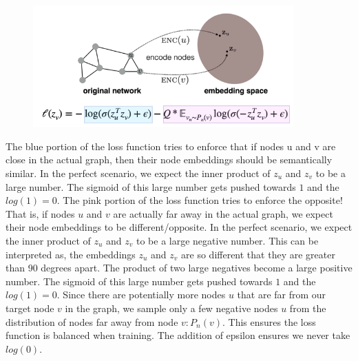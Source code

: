 \documentclass[12pt,a4paper]{article}
\begin{document}
\begin{figure}[h]
\includegraphics[width=10cm]{GraphSAGE-PIC-4}
\centering
\end{figure}
The blue portion of the loss function tries to enforce that if nodes u and v are close in the actual graph, then their node embeddings should be semantically similar. In the perfect scenario, we expect the inner product of $z_u$ and $z_v$ to be a large number. The sigmoid of this large number gets pushed towards $1$ and the $log(1) = 0$. The pink portion of the loss function tries to enforce the opposite! That is, if nodes $u$ and $v$ are actually far away in the actual graph, we expect their node embeddings to be different/opposite. In the perfect scenario, we expect the inner product of $z_{u}$ and $z_{v}$ to be a large negative number. This can be interpreted as, the embeddings $z_u$ and $z_v$ are so different that they are greater than 90 degrees apart. The product of two large negatives become a large positive number. The sigmoid of this large number gets pushed towards $1$ and the $log(1) = 0$. Since there are potentially more nodes $u$ that are far from our target node $v$ in the graph, we sample only a few negative nodes $u$ from the distribution of nodes far away from node $v: P_{n}(v)$. This ensures the loss function is balanced when training.
The addition of epsilon ensures we never take $log(0)$.

\newpage


\printbibliography
\end{document}

